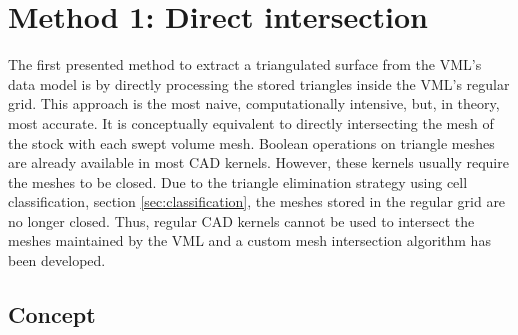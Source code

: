 
\chapter{Method 1: Direct intersection}
\label{ch:direct_intersection}

The first presented method to extract a triangulated surface from the VML's data model is by directly processing the stored triangles inside the VML's regular grid.
This approach is the most naive, computationally intensive, but, in theory, most accurate.
It is conceptually equivalent to directly intersecting the mesh of the stock with each swept volume mesh.
Boolean operations on triangle meshes are already available in most CAD kernels.
However, these kernels usually require the meshes to be closed.
Due to the triangle elimination strategy using cell classification, \cf section \ref{sec:classification}, the meshes stored in the regular grid are no longer closed.
Thus, regular CAD kernels cannot be used to intersect the meshes maintained by the VML and a custom mesh intersection algorithm has been developed.


\section{Concept}
\label{sec:direct_intersection_concept}

